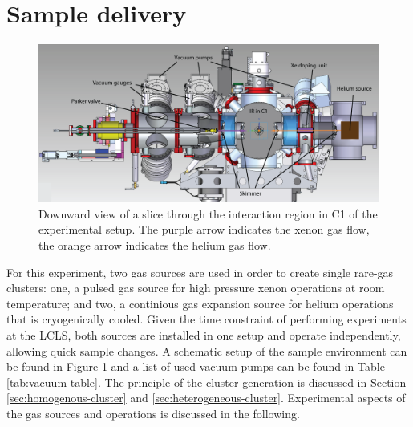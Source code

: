 \section{Sample delivery}\label{sec:sample-delivery}
\begin{figure}
	\centering
		\includegraphics[width=1.00\textwidth]{images/amoa1214-querschnitt.png}
	\caption[Sideview of double sample jet configuration.]{Downward view of a slice through the interaction region in C1 of the experimental setup. The purple arrow indicates the xenon gas flow, the orange arrow indicates the helium gas flow.}
	\label{fig:Overview-Jetalignment}
\end{figure}
For this experiment, two gas sources are used in order to create single rare-gas clusters: one, a pulsed gas source for high pressure xenon operations at room temperature; and two, a continious gas expansion source for helium operations that is cryogenically cooled. Given the time constraint of performing experiments at the LCLS, both sources are installed in one setup and operate independently, allowing quick sample changes. A schematic setup of the sample environment can be found in Figure \ref{fig:Overview-Jetalignment} and a list of used vacuum pumps can be found in Table \ref{tab:vacuum-table}. The principle of the cluster generation is discussed in Section \ref{sec:homogenous-cluster} and \ref{sec:heterogeneous-cluster}. Experimental aspects of the gas sources and operations is discussed in the following.\\[1\baselineskip]
